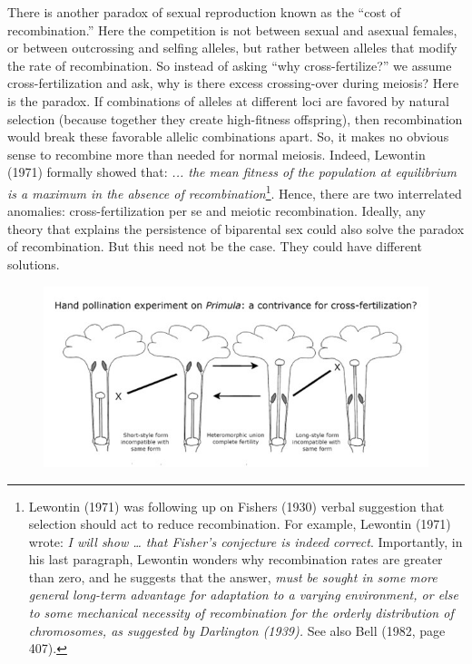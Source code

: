 \documentclass[
  11pt,
  letterpaper,
]{scrbook}
\begin{document}
There is another paradox of sexual reproduction known as the ``cost of
recombination.'' Here the competition is not between sexual and asexual
females, or between outcrossing and selfing alleles, but rather between
alleles that modify the rate of recombination. So instead of asking
``why cross-fertilize?'' we assume cross-fertilization and ask, why is
there excess crossing-over during meiosis? Here is the paradox. If
combinations of alleles at different loci are favored by natural
selection (because together they create high-fitness offspring), then
recombination would break these favorable allelic combinations apart.
So, it makes no obvious sense to recombine more than needed for normal
meiosis. Indeed, Lewontin (1971) formally showed that: \emph{... the
mean fitness of the population at equilibrium is a maximum in the
absence of recombination}\footnote{Lewontin (1971) was following up on
  Fisher\textquotesingle s (1930) verbal suggestion that selection
  should act to reduce recombination. For example, Lewontin (1971)
  wrote: \emph{I will show \ldots{} that Fisher's conjecture is indeed
  correct}. Importantly, in his last paragraph, Lewontin wonders why
  recombination rates are greater than zero, and he suggests that the
  answer, \emph{must be sought in some more general long-term advantage
  for adaptation to a varying environment, or else to some mechanical
  necessity of recombination for the orderly distribution of
  chromosomes, as suggested by Darlington (1939).} See also Bell (1982,
  page 407).}. Hence, there are two interrelated anomalies:
cross-fertilization per se and meiotic recombination. Ideally, any
theory that explains the persistence of biparental sex could also solve
the paradox of recombination. But this need not be the case. They could
have different solutions.

\begin{figure}


{\centering \includegraphics{images/fig1-3.jpg}

}

\end{figure}
\end{document}
